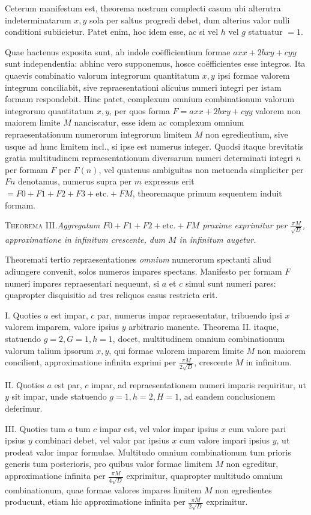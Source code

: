 Ceterum manifestum est, theorema nostrum complecti casum ubi alterutra indeterminatarum $x,y$ sola per saltus progredi debet, dum alterius valor nulli conditioni subiicietur. Patet enim, hoc idem esse, ac si vel $h$ vel $g$ statuatur $=1$.

Quae hactenus exposita sunt, ab indole coëfficientium formae $axx+2bxy+cyy$ sunt independentia: abhinc vero supponemus, hosce coëfficientes esse integros. Ita quaevis combinatio valorum integrorum quantitatum $x,y$ ipsi formae valorem integrum conciliabit, sive repraesentationi alicuius numeri integri per istam formam respondebit. Hinc patet, complexum omnium combinationum valorum integrorum quantitatum $x,y$, per quos forma $F=axx+2bxy+cyy$ valorem non maiorem limite $M$ nanciscatur, esse idem ac complexum omnium repraesentationum numerorum integrorum limitem $M$ non egredientium, sive usque ad hunc limitem incl., si ipse est numerus integer. Quodsi itaque brevitatis gratia multitudinem repraesentationum diversarum numeri determinati integri $n$ per formam $F$ per $F(n)$, vel quatenus ambiguitas non metuenda simpliciter per $Fn$ denotamus, numerus supra per $m$ expressus erit $=F0+F1+F2+F3+\text{etc.}+FM$, theoremaque primum sequentem induit formam.

\textsc{Theorema III.}\quad\emph{Aggregatum $F0+F1+F2+\text{etc.}+FM$ proxime exprimitur per $\frac{\pi M}{\surd D}$, approximatione in infinitum crescente, dum $M$ in infinitum augetur.}

Theoremati tertio repraesentationes \emph{omnium} numerorum spectanti aliud adiungere convenit, solos numeros impares spectans. Manifesto per formam $F$ numeri impares repraesentari nequeunt, si $a$ et $c$ simul sunt numeri pares: quapropter disquisitio ad tres reliquos casus restricta erit.

I. Quoties $a$ est impar, $c$ par, numerus impar repraesentatur, tribuendo ipsi $x$ valorem imparem, valore ipsius $y$ arbitrario manente. Theorema II. 
itaque, statuendo $g=2,G=1,h=1$, docet, multitudinem omnium combinationum valorum talium ipsorum $x,y$, qui formae valorem imparem limite $M$ non maiorem concilient, approximatione infinita exprimi per $\frac{\pi M}{2\surd D}$, crescente $M$ in infinitum.

II. Quoties $a$ est par, $c$ impar, ad repraesentationem numeri imparis requiritur, ut $y$ sit impar, unde statuendo $g=1,h=2,H=1$, ad eandem conclusionem deferimur.

III. Quoties tum $a$ tum $c$ impar est, vel valor impar ipsius $x$ cum valore pari ipsius $y$ combinari debet, vel valor par ipsius $x$ cum valore impari ipsius $y$, ut prodeat valor impar formulae. Multitudo omnium combinationum tum prioris generis tum posterioris, pro quibus valor formae limitem $M$ non egreditur, approximatione infinita per $\frac{\pi M}{4\surd D}$ exprimitur, quapropter multitudo omnium combinationum, quae formae valores impares limitem $M$ non egredientes producunt, etiam hic approximatione infinita per $\frac{\pi M}{2\surd D}$ exprimitur.

